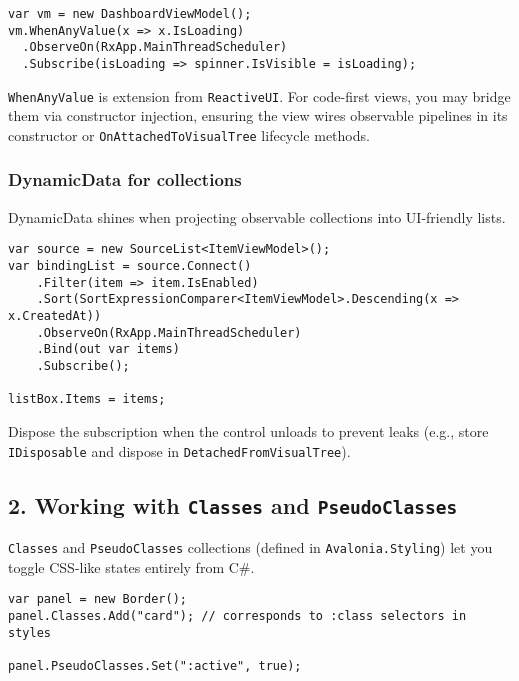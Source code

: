 \begin{lstlisting}
var vm = new DashboardViewModel();
vm.WhenAnyValue(x => x.IsLoading)
  .ObserveOn(RxApp.MainThreadScheduler)
  .Subscribe(isLoading => spinner.IsVisible = isLoading);
\end{lstlisting}

\passthrough{\lstinline!WhenAnyValue!} is extension from
\passthrough{\lstinline!ReactiveUI!}. For code-first views, you may
bridge them via constructor injection, ensuring the view wires
observable pipelines in its constructor or
\passthrough{\lstinline!OnAttachedToVisualTree!} lifecycle methods.

\subsubsection{DynamicData for
collections}\label{dynamicdata-for-collections}

DynamicData shines when projecting observable collections into
UI-friendly lists.

\begin{lstlisting}
var source = new SourceList<ItemViewModel>();
var bindingList = source.Connect()
    .Filter(item => item.IsEnabled)
    .Sort(SortExpressionComparer<ItemViewModel>.Descending(x => x.CreatedAt))
    .ObserveOn(RxApp.MainThreadScheduler)
    .Bind(out var items)
    .Subscribe();

listBox.Items = items;
\end{lstlisting}

Dispose the subscription when the control unloads to prevent leaks
(e.g., store \passthrough{\lstinline!IDisposable!} and dispose in
\passthrough{\lstinline!DetachedFromVisualTree!}).

\subsection{\texorpdfstring{2. Working with \texttt{Classes} and
\texttt{PseudoClasses}}{2. Working with Classes and PseudoClasses}}\label{working-with-classes-and-pseudoclasses}

\passthrough{\lstinline!Classes!} and
\passthrough{\lstinline!PseudoClasses!} collections (defined in
\passthrough{\lstinline!Avalonia.Styling!}) let you toggle CSS-like
states entirely from C\#.

\begin{lstlisting}
var panel = new Border();
panel.Classes.Add("card"); // corresponds to :class selectors in styles

panel.PseudoClasses.Set(":active", true);
\end{lstlisting}

